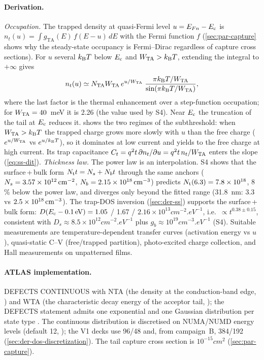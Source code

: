 \paragraph{Derivation.}
\emph{Occupation.} The trapped density at quasi-Fermi level $u = E_{Fn}-E_{\mathrm{c}}$ is
$n_t(u) = \int g_{\mathrm{TA}}(E)\,f(E-u)\,dE$ with the Fermi function $f$ (\cref{sec:par-capture} shows why the
steady-state occupancy is Fermi--Dirac regardless of capture cross sections). For $u$ several $k_{\mathrm{B}}T$ below $E_{\mathrm{c}}$
and $W_{\mathrm{TA}} > k_{\mathrm{B}}T$, extending the integral to $+\infty$ gives
\begin{equation}
  n_t(u) \simeq N_{\mathrm{TA}}W_{\mathrm{TA}}\,e^{u/W_{\mathrm{TA}}}\;\frac{\pi k_{\mathrm{B}}T/W_{\mathrm{TA}}}{\sin(\pi k_{\mathrm{B}}T/W_{\mathrm{TA}})},
  \label{eq:d1-nt-occ}
\end{equation}
where the last factor is the thermal enhancement over a step-function occupation; for $W_{\mathrm{TA}} = 40$~meV it is
2.26 (the value used by S4). Near $E_{\mathrm{c}}$ the truncation of the tail at $E_{\mathrm{c}}$ reduces it.  shows
the two regimes of the subthreshold: when $W_{\mathrm{TA}} > k_{\mathrm{B}}T$ the trapped charge grows more slowly with $u$ than the
free charge ($e^{u/W_{\mathrm{TA}}}$ vs $e^{u/k_{\mathrm{B}}T}$), so it dominates at low current and yields to the free charge at high
current. Its trap capacitance $C_t = q^2 t\,\partial n_t/\partial u = q^2 t\,n_t/W_{\mathrm{TA}}$ enters the slope
(\cref{eq:ss-dit}).
\emph{Thickness law.} The power law is an interpolation. S4 shows that the surface\,+\,bulk form
$N_{\mathrm{t}} t = N_s + N_b t$ through the same anchors ($N_s = 3.57\times10^{12}\,\mathrm{cm}^{-2}$, $N_b = 2.15\times10^{18}\,\mathrm{cm}^{-3}$)
predicts $N_{\mathrm{t}}(6.3) = 7.8\times10^{18}$, 8\,\% below the power law, and diverges only beyond the fitted range
(31.8~nm: $3.3$ vs $2.5\times10^{18}\,\mathrm{cm}^{-3}$). The trap-DOS inversion (\cref{sec:der-ss}) supports the surface\,+\,bulk
form: $D(E_{\mathrm{c}}-0.1\,\mathrm{eV}) = 1.05$ / 1.67 / $2.16\times10^{13}\si{cm^{-2}.eV^{-1}}$, i.e.\ $\propto t^{0.38\pm0.15}$,
consistent with $D_s \approx 8.5\times10^{12}\si{cm^{-2}.eV^{-1}}$ plus $g_b \approx 10^{19}\si{cm^{-3}.eV^{-1}}$ (S4).
Suitable measurements are temperature-dependent transfer curves (activation energy vs $u$), quasi-static
C--V (free/trapped partition), photo-excited charge collection, and Hall measurements on unpatterned films.

\paragraph{ATLAS implementation.}
DEFECTS CONTINUOUS with NTA (the density at the conduction-band edge, \citealp[p.~1171]{AtlasManual}) and WTA
(the characteristic decay energy of the acceptor tail, \citealp[p.~1173]{AtlasManual}); the DEFECTS statement
admits one exponential and one Gaussian distribution per state type \citep[p.~1169]{AtlasManual}. The continuous
distribution is discretised on NUMA/NUMD energy levels (default 12, \citealp[p.~1168]{AtlasManual}); the V1 decks
use 96/48 and, from campaign~B, 384/192 (\cref{sec:der-dos-discretization}). The tail capture cross section is
$10^{-15}\si{cm^2}$ (\cref{sec:par-capture}).


